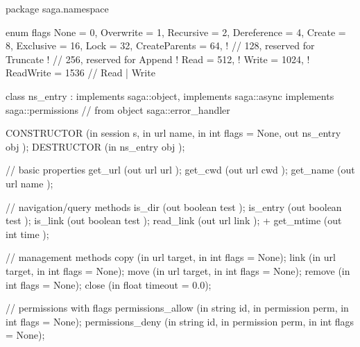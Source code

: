  \begin{myspec}
  package saga.namespace
  {
    enum flags
    {
      None            =    0,
      Overwrite       =    1,
      Recursive       =    2,
      Dereference     =    4,
      Create          =    8,
      Exclusive       =   16,
      Lock            =   32,
      CreateParents   =   64,
!     //                 128,    reserved for Truncate
!     //                 256,    reserved for Append
!     Read            =  512,
!     Write           = 1024,
!     ReadWrite       = 1536  // Read | Write
    }
 
 
    class ns_entry : implements   saga::object,
                     implements   saga::async
                     implements   saga::permissions
                  // from object  saga::error_handler
    {
      CONSTRUCTOR        (in  session        s,
                          in  url            name,
                          in  int            flags   = None,
                          out ns_entry       obj     );
      DESTRUCTOR         (in  ns_entry       obj     );
 
      // basic properties
      get_url            (out url            url     );
      get_cwd            (out url            cwd     );
      get_name           (out url            name    );
 
      // navigation/query methods
      is_dir             (out boolean        test    );
      is_entry           (out boolean        test    );
      is_link            (out boolean        test    );
      read_link          (out url            link    );
+     get_mtime          (out int            time    );
 
      // management methods
      copy               (in  url            target,
                          in  int            flags = None);
      link               (in  url            target,
                          in  int            flags = None);
      move               (in  url            target,
                          in  int            flags = None);
      remove             (in  int            flags = None);
      close              (in  float          timeout = 0.0);
 
 
      // permissions with flags
      permissions_allow  (in  string         id,
                          in  permission     perm, 
                          in  int            flags = None);
      permissions_deny   (in  string         id,
                          in  permission     perm, 
                          in  int            flags = None);
    }
 
}
\end{myspec}
